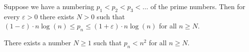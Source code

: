\begin{theorem} 
	\label{prelim:thm:PTN}
	Suppose we have a numbering  $p_1 < p_2 < p_3 < \ldots$ of the prime numbers.	
	Then for every $\varepsilon > 0$
	there exists $N > 0$ such that $(1 - \varepsilon)\cdot n\log(n) \le p_n \le (1 + \varepsilon)\cdot n\log(n)$ for all $n \ge N$.
\end{theorem} 

\begin{corollary}
	\label{prelim:cor:PNT}
	There exists a number $N \ge 1$ such that $p_n < n^2$
	for all $n \ge N$.	
\end{corollary}

%	
